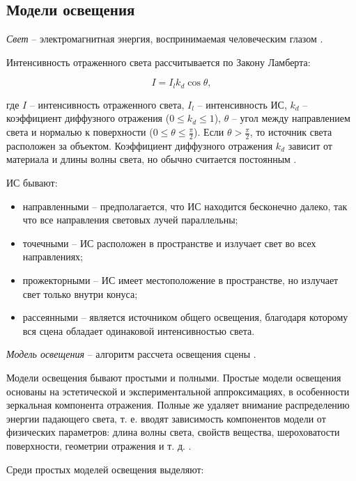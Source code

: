 \subsection{Модели освещения}

\textit{Свет} -- электромагнитная энергия, воспринимаемая человеческим глазом \cite{big_rus_enc}.

Интенсивность отраженного света рассчитывается по Закону Ламберта:

\begin{equation}
	I = I_l k_d \cos \theta,
\end{equation}

где $I$ -- интенсивность отраженного света, $I_l$ -- интенсивность ИС, $k_d$ -- коэффициент диффузного отражения ($0 \leq k_d \leq 1$), $\theta$ -- угол между направлением света и нормалью к поверхности ($0 \leq \theta \leq \frac{\pi}{2}$). Если $\theta > \frac{\pi}{2}$, то источник света расположен за объектом. Коэффициент диффузного отражения $k_d$ зависит от материала и длины волны света, но обычно считается постоянным \cite{rogers}.

ИС бывают:

\begin{itemize}
	\item направленными -- предполагается, что ИС находится бесконечно далеко, так что все направления световых лучей параллельны;
	\item точечными -- ИС расположен в пространстве и излучает свет во всех направлениях;
	\item прожекторными -- ИС имеет местоположение в пространстве, но излучает свет только внутри конуса;
	\item рассеянными -- является источником общего освещения, благодаря которому вся сцена обладает одинаковой интенсивностью света.
\end{itemize}

\textit{Модель освещения} -- алгоритм рассчета освещения сцены \cite{eberly20063d}. 

Модели освещения бывают простыми и полными. Простые модели освещения основаны на эстетической и экспериментальной аппроксимациях, в особенности зеркальная компонента отражения. Полные же удаляет внимание распределению энергии падающего света, т. е. вводят зависимость компонентов модели от физических параметров: длина волны света, свойств вещества, шероховатости поверхности, геометрии отражения и т. д. \cite{rogers}.

Среди простых моделей освещения выделяют:

